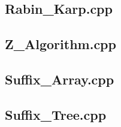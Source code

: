 \subsection{Rabin\_Karp.cpp}

\subsection{Z\_Algorithm.cpp}

\subsection{Suffix\_Array.cpp}

\subsection{Suffix\_Tree.cpp}

